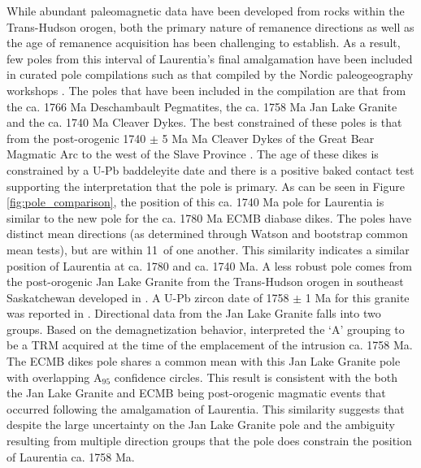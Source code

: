 \documentclass[draft]{agujournal2019}
\begin{document}
While abundant paleomagnetic data have been developed from rocks within the Trans-Hudson orogen, both the primary nature of remanence directions as well as the age of remanence acquisition has been challenging to establish. As a result, few poles from this interval of Laurentia's final amalgamation have been included in curated pole compilations such as that compiled by the Nordic paleogeography workshops \cite{Evans2021a}. The poles that have been included in the  compilation are that from the ca. 1766 Ma Deschambault Pegmatites, the ca. 1758 Ma Jan Lake Granite and the ca. 1740 Ma Cleaver Dykes. The best constrained of these poles is that from the post-orogenic 1740 $\pm$ 5 Ma Ma Cleaver Dykes of the Great Bear Magmatic Arc to the west of the Slave Province \cite{Irving2004a}. The age of these dikes is constrained by a U-Pb baddeleyite date and there is a positive baked contact test supporting the interpretation that the pole is primary. As can be seen in Figure \ref{fig:pole_comparison}, the position of this ca. 1740 Ma pole for Laurentia is similar to the new pole for the ca. 1780 Ma ECMB diabase dikes. The poles have distinct mean directions (as determined through Watson and bootstrap common mean tests), but are within 11\textdegree\ of one another. This similarity indicates a similar position of Laurentia at ca. 1780 and ca. 1740 Ma. A less robust pole comes from the post-orogenic Jan Lake Granite from the Trans-Hudson orogen in southeast Saskatchewan developed in . A U-Pb zircon date of 1758 $\pm$ 1 Ma for this granite was reported in . Directional data from the Jan Lake Granite falls into two groups. Based on the demagnetization behavior, \cite{Irving2004a} interpreted the `A' grouping to be a TRM acquired at the time of the emplacement of the intrusion ca. 1758 Ma.  The ECMB dikes pole shares a common mean with this Jan Lake Granite pole with overlapping A$_{95}$ confidence circles. This result is consistent with the both the Jan Lake Granite and ECMB being post-orogenic magmatic events that occurred following the amalgamation of Laurentia. This similarity suggests that despite the large uncertainty on the Jan Lake Granite pole and the ambiguity resulting from multiple direction groups that the pole does constrain the position of Laurentia ca. 1758 Ma.
\end{document}
